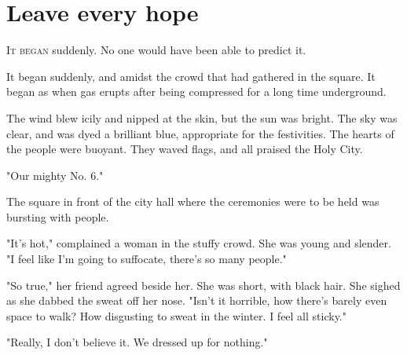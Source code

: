
\chapter{Leave every hope}


\lettrine{I}{t began} suddenly. No one would have been able to predict it.

It began suddenly, and amidst the crowd that had gathered in the square.
It began as when gas erupts after being compressed for a long time
underground.

\clearpage


The wind blew icily and nipped at the skin, but the sun was bright. The
sky was clear, and was dyed a brilliant blue, appropriate for the
festivities. The hearts of the people were buoyant. They waved flags,
and all praised the Holy City.

"Our mighty No. 6."

The square in front of the city hall where the ceremonies were to be
held was bursting with people.

"It's hot," complained a woman in the stuffy crowd. She was young and
slender. "I feel like I'm going to suffocate, there's so many people."

"So true," her friend agreed beside her. She was short, with black hair.
She sighed as she dabbed the sweat off her nose. "Isn't it horrible, how
there's barely even space to walk? How disgusting to sweat in the
winter. I feel all sticky."

"Really, I don't believe it. We dressed up for nothing."

